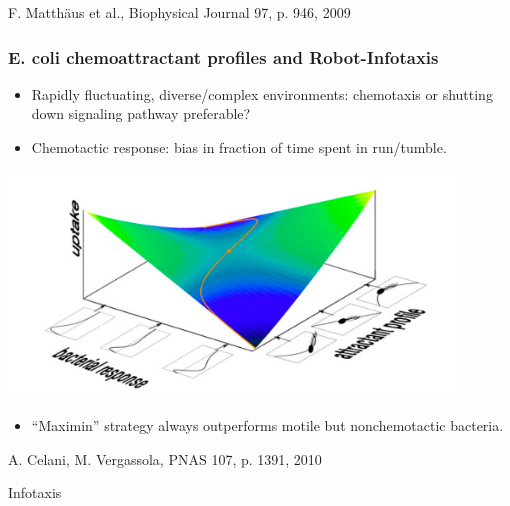 \documentclass[11pt]{beamer}
\begin{document}
\begin{frame}
 \begin{center}
  {\tiny F. Matthäus et al., Biophysical Journal 97, p. 946, 2009}
 \end{center}
\end{frame}


\begin{frame}
 \frametitle{E. coli chemoattractant profiles and Robot-Infotaxis}
 
 \begin{minipage}[h]{0.64\textwidth}
  \begin{itemize}
   \item Rapidly fluctuating, diverse/complex environments: chemotaxis or shutting down signaling pathway preferable?
   \item Chemotactic response: bias in fraction of time spent in run/tumble.
  \end{itemize}
  \centering
  \includegraphics[width=0.9\textwidth]{gfx/responseprofile.png}
  \begin{itemize}
   \item ``Maximin'' strategy always outperforms motile but nonchemotactic bacteria.
  \end{itemize}
  {\tiny A. Celani, M. Vergassola, PNAS 107, p. 1391, 2010}
 \end{minipage}
 \begin{minipage}[h]{0.35\textwidth}
  \centering
  Infotaxis

\end{minipage}
\end{frame}
\end{document}
